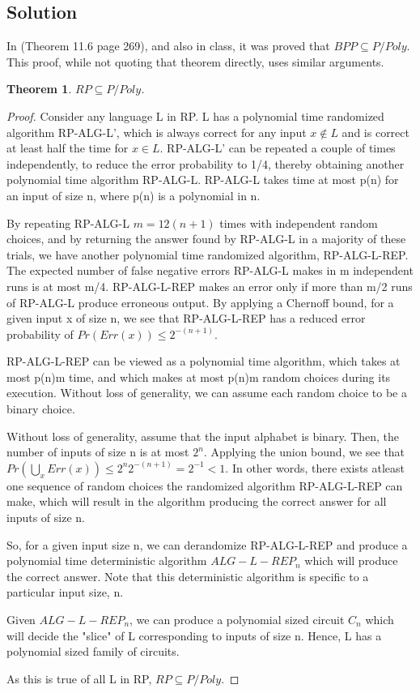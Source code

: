 \documentclass[10pt]{amsart}
\newtheorem{thm}{Theorem}[subsection]
\theoremstyle{remark}
\begin{document}
\subsection{Solution}
In \cite{papadimitriouCC} (Theorem 11.6 page 269), and also in class, it was proved that $BPP \subseteq P/Poly$. This proof, while not quoting that theorem directly, uses similar arguments.

\begin{thm}
$RP \subseteq P/Poly$.
\end{thm}
\begin{proof}
Consider any language L in RP. L has a polynomial time randomized algorithm RP-ALG-L', which is always correct for any input $x \notin L$ and is correct at least half the time for $x \in L$. RP-ALG-L' can be repeated a couple of times independently, to reduce the error probability to 1/4, thereby obtaining another polynomial time algorithm RP-ALG-L. RP-ALG-L takes time at most p(n) for an input of size n, where p(n) is a polynomial in n.

By repeating RP-ALG-L $m=12(n+1)$ times with independent random choices, and by returning the answer found by RP-ALG-L in a majority of these trials, we have another polynomial time randomized algorithm, RP-ALG-L-REP. The expected number of false negative errors RP-ALG-L makes in m independent runs is at most m/4. RP-ALG-L-REP makes an error only if more than m/2 runs of RP-ALG-L produce erroneous output. By applying a Chernoff bound, for a given input x of size n, we see that RP-ALG-L-REP has a reduced error probability of $Pr(Err(x)) \leq 2^{-(n+1)}$.

RP-ALG-L-REP can be viewed as a polynomial time algorithm, which takes at most p(n)m time, and which makes at most p(n)m random choices during its execution. Without loss of generality, we can assume each random choice to be a binary choice.

Without loss of generality, assume that the input alphabet is binary. Then, the number of inputs of size n is at most $2^{n}$. Applying the union bound, we see that $Pr(\bigcup_{x} Err(x)) \leq 2^{n}2^{-(n+1)} = 2^{-1} < 1$. In other words, there exists atleast one sequence of random choices the randomized algorithm RP-ALG-L-REP can make, which will result in the algorithm producing the correct answer for all inputs of size n.

So, for a given input size n, we can derandomize RP-ALG-L-REP and produce a polynomial time deterministic algorithm $ALG-L-REP_{n}$ which will produce the correct answer. Note that this deterministic algorithm is specific to a particular input size, n.

Given $ALG-L-REP_{n}$, we can produce a polynomial sized circuit $C_{n}$ which will decide the "slice" of L corresponding to inputs of size n. Hence, L has a polynomial sized family of circuits.

As this is true of all L in RP, $RP \subseteq P/Poly$.
\end{proof}
\end{document}
